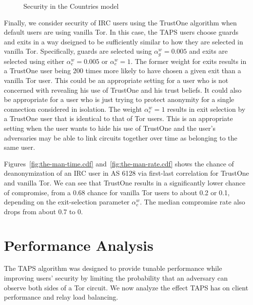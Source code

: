 \documentclass[conference]{styles/IEEEtran}
\newcommand{\ps}{TAPS\xspace}
\begin{document}
\begin{figure}[t]
\vspace{-4mm}
\caption{\small Security in the \textsf{Countries} model}
\vspace{-4mm}
\label{fig:countries}
\end{figure}
 
Finally, we consider security of IRC users using the TrustOne algorithm when default users are
using vanilla Tor.
In this case, the \ps users choose guards and exits in a way dseigned to be sufficiently similar to
how they are selected in vanilla Tor. Specifically, guards are selected using
$\alpha^w_g = 0.005$ and
exits are selected using either $\alpha^w_e = 0.005$ or $\alpha^w_e = 1$. The former
weight for exits results in a TrustOne user being 200 times more likely to have chosen a given exit
than a vanilla Tor user. This could be an appropriate setting for a user who is not concerned with
revealing his use of TrustOne and his trust beliefs. It could also be
appropriate for a user who
is just trying to protect anonymity for a single connection considered in isolation. The weight
$\alpha^w_e = 1$ results in exit selection by a TrustOne user that is identical
to that of Tor users. This is an appropriate setting when the user wants to hide his use of
TrustOne and the user's adversaries may be able to link circuits together over time as belonging to
the same user.

Figures~\ref{fig:the-man-time.cdf} and~\ref{fig:the-man-rate.cdf} shows the chance of deanonymization of an IRC user in AS 6128 via first-last correlation
for TrustOne and vanilla Tor. We can see that TrustOne results in a significantly
lower chance of compromise, from a 0.68 chance for vanilla Tor users to about 0.2 or 0.1,
depending on the exit-selection parameter $\alpha^w_e$. The median compromise rate also drops
from about 0.7 to 0. \section{Performance Analysis}\label{sec:perf}

The \ps algorithm was designed to provide tunable
performance while improving users' security by limiting the probability that an
adversary can observe both sides of a Tor circuit. We now analyze the effect \ps
has on client performance and relay load balancing.
\end{document}
